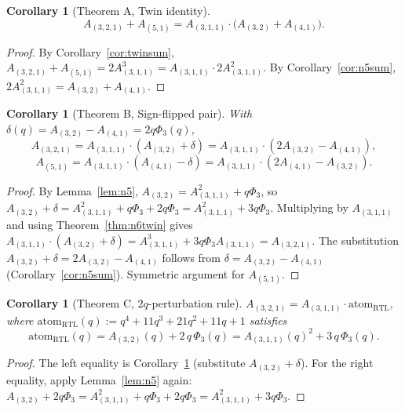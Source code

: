 \documentclass[11pt]{article}
\theoremstyle{plain}
\newtheorem{corollary}[theorem]{Corollary}
\theoremstyle{definition}
\theoremstyle{remark}
\newcommand{\PhiThree}{\Phi_3}
\begin{document}
\begin{corollary}[Theorem A, Twin identity]\label{cor:A}
\[
A_{(3,2,1)} + A_{(5,1)} = A_{(3,1,1)}\cdot \bigl(A_{(3,2)} + A_{(4,1)}\bigr).
\]
\end{corollary}

\begin{proof}
By Corollary~\ref{cor:twinsum}, $A_{(3,2,1)} + A_{(5,1)} = 2 A_{(3,1,1)}^3
= A_{(3,1,1)}\cdot 2 A_{(3,1,1)}^2$.  By Corollary~\ref{cor:n5sum},
$2 A_{(3,1,1)}^2 = A_{(3,2)} + A_{(4,1)}$.\qedhere
\end{proof}

\begin{corollary}[Theorem B, Sign-flipped pair]\label{cor:B}
With $\delta(q) = A_{(3,2)} - A_{(4,1)} = 2q\PhiThree(q)$,
\[
A_{(3,2,1)} = A_{(3,1,1)}\cdot(A_{(3,2)} + \delta) = A_{(3,1,1)}\cdot(2 A_{(3,2)} - A_{(4,1)}),
\]
\[
A_{(5,1)}  = A_{(3,1,1)}\cdot(A_{(4,1)} - \delta) = A_{(3,1,1)}\cdot(2 A_{(4,1)} - A_{(3,2)}).
\]
\end{corollary}

\begin{proof}
By Lemma~\ref{lem:n5}, $A_{(3,2)} = A_{(3,1,1)}^2 + q\PhiThree$, so
$A_{(3,2)} + \delta = A_{(3,1,1)}^2 + q\PhiThree + 2 q\PhiThree =
A_{(3,1,1)}^2 + 3 q\PhiThree$.  Multiplying by $A_{(3,1,1)}$ and using
Theorem~\ref{thm:n6twin} gives $A_{(3,1,1)}\cdot (A_{(3,2)} + \delta) =
A_{(3,1,1)}^3 + 3q\PhiThree A_{(3,1,1)} = A_{(3,2,1)}$.  The substitution
$A_{(3,2)} + \delta = 2 A_{(3,2)} - A_{(4,1)}$ follows from
$\delta = A_{(3,2)} - A_{(4,1)}$ (Corollary~\ref{cor:n5sum}).  Symmetric
argument for $A_{(5,1)}$.\qedhere
\end{proof}

\begin{corollary}[Theorem C, $2q$-perturbation rule]\label{cor:C}
$A_{(3,2,1)} = A_{(3,1,1)}\cdot \mathrm{atom}_{\mathrm{RTL}}$, where
$\mathrm{atom}_{\mathrm{RTL}}(q) := q^4 + 11 q^3 + 21 q^2 + 11 q + 1$ satisfies
\[
\mathrm{atom}_{\mathrm{RTL}}(q) = A_{(3,2)}(q) + 2\,q\,\PhiThree(q)
                                = A_{(3,1,1)}(q)^2 + 3\,q\,\PhiThree(q).
\]
\end{corollary}

\begin{proof}
The left equality is Corollary~\ref{cor:B} (substitute $A_{(3,2)} + \delta$).
For the right equality, apply Lemma~\ref{lem:n5} again:
$A_{(3,2)} + 2q\PhiThree = A_{(3,1,1)}^2 + q\PhiThree + 2q\PhiThree = A_{(3,1,1)}^2 + 3q\PhiThree$.\qedhere
\end{proof}
\end{document}
